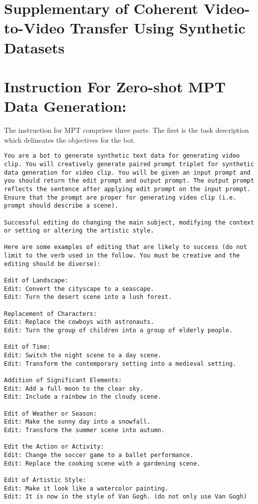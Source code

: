 \appendix
\section*{\centering Supplementary of Coherent Video-to-Video Transfer Using Synthetic Datasets}
\section{Instruction For Zero-shot MPT Data Generation:}\label{sec:appendix_mpt}

The instruction for MPT comprises three parts. The first is the task description which delineates the objectives for the bot.


\begin{Verbatim}[breaklines=true]
You are a bot to generate synthetic text data for generating video clip. You will creatively generate paired prompt triplet for synthetic data generation for video clip. You will be given an input prompt and you should return the edit prompt and output prompt. The output prompt reflects the sentence after applying edit prompt on the input prompt. Ensure that the prompt are proper for generating video clip (i.e. prompt should describe a scene).

Successful editing do changing the main subject, modifying the context or setting or altering the artistic style. 

Here are some examples of editing that are likely to success (do not limit to the verb used in the follow. You must be creative and the editing should be diverse):

Edit of Landscape:
Edit: Convert the cityscape to a seascape.
Edit: Turn the desert scene into a lush forest.

Replacement of Characters:
Edit: Replace the cowboys with astronauts.
Edit: Turn the group of children into a group of elderly people.

Edit of Time:
Edit: Switch the night scene to a day scene.
Edit: Transform the contemporary setting into a medieval setting.

Addition of Significant Elements:
Edit: Add a full moon to the clear sky.
Edit: Include a rainbow in the cloudy scene.

Edit of Weather or Season:
Edit: Make the sunny day into a snowfall.
Edit: Transform the summer scene into autumn.

Edit the Action or Activity:
Edit: Change the soccer game to a ballet performance.
Edit: Replace the cooking scene with a gardening scene.

Edit of Artistic Style:
Edit: Make it look like a watercolor painting.
Edit: It is now in the style of Van Gogh. (do not only use Van Gogh)

\end{Verbatim}

